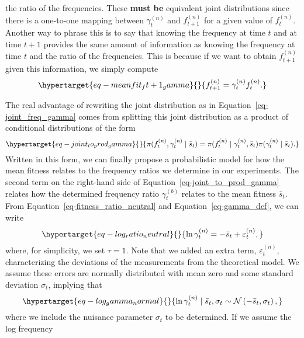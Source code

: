 \documentclass[
]{scrartcl}
\begin{document}
\begin{refsegment}
the ratio of the frequencies. These \textbf{must be} equivalent joint
distributions since there is a one-to-one mapping between
\(\gamma_t^{(n)}\) and \(f_{t+1}^{(n)}\) for a given value of
\(f_t^{(n)}\). Another way to phrase this is to say that knowing the
frequency at time \(t\) and at time \(t+1\) provides the same amount of
information as knowing the frequency at time \(t\) and the ratio of the
frequencies. This is because if we want to obtain \(f_{t+1}^{(n)}\)
given this information, we simply compute
\begin{equation}\protect\hypertarget{eq-meanfit_ft+1_gamma}{}{
f_{t+1}^{(n)} = \gamma_t^{(n)} f_t^{(n)}.
}\label{eq-meanfit_ft+1_gamma}\end{equation}

The real advantage of rewriting the joint distribution as in
Equation~\ref{eq-joint_freq_gamma} comes from splitting this joint
distribution as a product of conditional distributions of the form
\begin{equation}\protect\hypertarget{eq-joint_to_prod_gamma}{}{
\pi(f_t^{(n)}, \gamma_{t}^{(n)} \mid \bar{s}_t) =
\pi(f_t^{(n)} \mid \gamma_{t}^{(n)}, \bar{s}_t)
\pi(\gamma_{t}^{(n)} \mid \bar{s}_t).
}\label{eq-joint_to_prod_gamma}\end{equation} Written in this form, we
can finally propose a probabilistic model for how the mean fitness
relates to the frequency ratios we determine in our experiments. The
second term on the right-hand side of
Equation~\ref{eq-joint_to_prod_gamma} relates how the determined
frequency ratio \(\gamma_t^{(b)}\) relates to the mean fitness
\(\bar{s}_t\). From Equation~\ref{eq-fitness_ratio_neutral} and
Equation~\ref{eq-gamma_def}, we can write
\begin{equation}\protect\hypertarget{eq-log_ratio_neutral}{}{
\ln \gamma_t^{(n)} = - \bar{s}_t + \varepsilon_t^{(n)},
}\label{eq-log_ratio_neutral}\end{equation} where, for simplicity, we
set \(\tau = 1\). Note that we added an extra term,
\(\varepsilon_t^{(n)}\), characterizing the deviations of the
measurements from the theoretical model. We assume these errors are
normally distributed with mean zero and some standard deviation
\(\sigma_t\), implying that
\begin{equation}\protect\hypertarget{eq-log_gamma_normal}{}{
\ln \gamma_t^{(n)} \mid \bar{s}_t, \sigma_t  \sim 
\mathcal{N}\left(-\bar{s}_t, \sigma_t \right),
}\label{eq-log_gamma_normal}\end{equation} where we include the nuisance
parameter \(\sigma_t\) to be determined. If we assume the log frequency

\end{refsegment}
\end{document}
